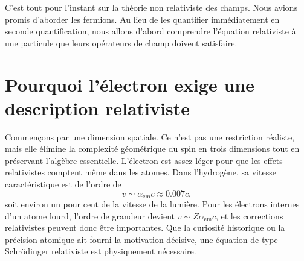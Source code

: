 \begin{classroomqa}
\end{classroomqa}

\begin{classroomqa}
\end{classroomqa}

C’est tout pour l’instant sur la théorie non relativiste des champs. Nous avions promis d’aborder les fermions. Au lieu de les quantifier immédiatement en seconde quantification, nous allons d’abord comprendre l’équation relativiste à une particule que leurs opérateurs de champ doivent satisfaire.

\section{Pourquoi l’électron exige une description relativiste}

Commençons par une dimension spatiale. Ce n’est pas une restriction réaliste, mais elle élimine la complexité géométrique du spin en trois dimensions tout en préservant l’algèbre essentielle. L’électron est assez léger pour que les effets relativistes comptent même dans les atomes. Dans l’hydrogène, sa vitesse caractéristique est de l’ordre de
\begin{equation}
v\sim\alpha_{\mathrm{em}}c\approx 0.007c,
\end{equation}
soit environ un pour cent de la vitesse de la lumière. Pour les électrons internes d’un atome lourd, l’ordre de grandeur devient \(v\sim Z\alpha_{\mathrm{em}}c\), et les corrections relativistes peuvent donc être importantes. Que la curiosité historique ou la précision atomique ait fourni la motivation décisive, une équation de type Schr\"odinger relativiste est physiquement nécessaire.

